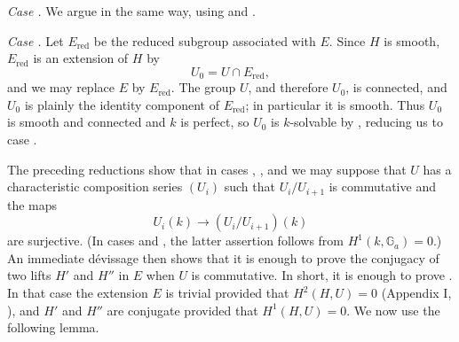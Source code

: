 \medskip\noindent\textit{Case .}\quad
We argue in the same way, using  and .

\medskip\noindent\textit{Case .}\quad
Let \(E_{\mathrm{red}}\) be the reduced subgroup associated with
\(E\).  Since \(H\) is smooth, \(E_{\mathrm{red}}\) is an
extension of \(H\) by
\[
  U_0=U\cap E_{\mathrm{red}},
\]
and we may replace \(E\) by \(E_{\mathrm{red}}\).  The group \(U\),
and therefore \(U_0\), is connected, and \(U_0\) is plainly the
identity component of \(E_{\mathrm{red}}\); in particular it is
smooth.  Thus \(U_0\) is smooth and connected and \(k\) is
perfect, so \(U_0\) is \(k\)-solvable by , reducing us to
case .

The preceding reductions show that in cases , , and  we
may suppose that \(U\) has a characteristic composition series
\((U_i)\) such that \(U_i/U_{i+1}\) is commutative and the maps
\[
  U_i(k)\longrightarrow (U_i/U_{i+1})(k)
\]
are surjective.  (In cases  and , the latter assertion
follows from \(H^1(k,\mathbb G_a)=0\).)  An immediate dévissage
then shows that it is enough to prove the conjugacy of two lifts
\(H'\) and \(H''\) in \(E\) when \(U\) is commutative.  In short,
it is enough to prove .  In that case the extension \(E\)
is trivial provided that \(H^2(H,U)=0\) (Appendix I, ), and
\(H'\) and \(H''\) are conjugate provided that \(H^1(H,U)=0\).
We now use the following lemma.


